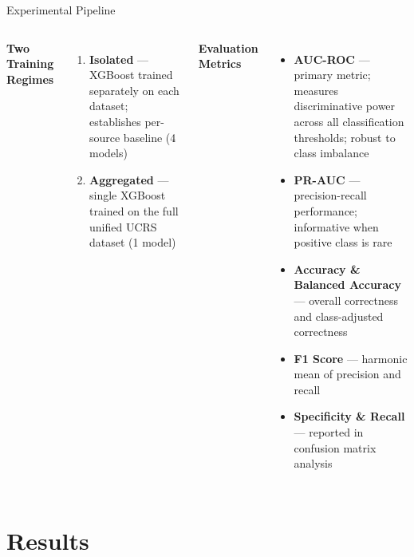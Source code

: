 \documentclass[9pt,aspectratio=169]{beamer}
\begin{document}
\begin{frame}{Experimental Pipeline}
\begin{columns}[T]
    \footnotesize\textbf{Two Training Regimes}
    \begin{enumerate}\setlength\itemsep{3pt}
      \item \textbf{Isolated} — XGBoost trained separately on each dataset; establishes per-source baseline (4 models)
      \item \textbf{Aggregated} — single XGBoost trained on the full unified UCRS dataset (1 model)
    \end{enumerate}
    \vspace{5pt}
    \footnotesize\textbf{Evaluation Metrics}
    \begin{itemize}\setlength\itemsep{4pt}
      \item[\small$\bullet$] \textbf{AUC-ROC} — primary metric; measures discriminative power across all classification thresholds; robust to class imbalance
      \item[\small$\bullet$] \textbf{PR-AUC} — precision-recall performance; informative when positive class is rare
      \item[\small$\bullet$] \textbf{Accuracy \& Balanced Accuracy} — overall correctness and class-adjusted correctness
      \item[\small$\bullet$] \textbf{F1 Score} — harmonic mean of precision and recall
      \item[\small$\bullet$] \textbf{Specificity \& Recall} — reported in confusion matrix analysis
    \end{itemize}
\end{columns}
\end{frame}

\section{Results}
\end{document}
